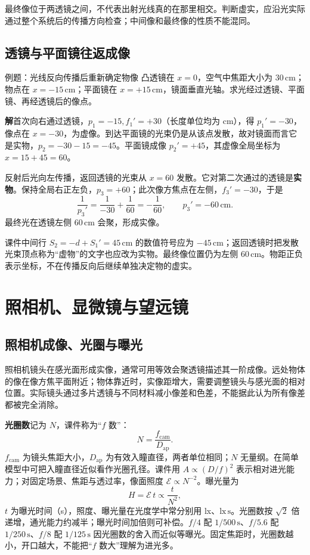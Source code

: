 \documentclass[UTF8,fontset=none,zihao=-4,a4paper]{ctexart}
\newcommand{\chapterpage}[1]{\clearpage\section{#1}}
\newcommand{\term}[1]{\textbf{#1}}
\newcommand{\unit}[1]{\,\mathrm{#1}}
\newcommand{\sol}{\par\noindent\textbf{解}\quad}
\begin{document}
最终像位于两透镜之间，不代表出射光线真的在那里相交。判断虚实，应沿光实际通过整个系统后的传播方向检查；中间像和最终像的性质不能混同。

\subsection{透镜与平面镜往返成像}
\begin{infobox}{例题：光线反向传播后重新确定物像}
凸透镜在 $x=0$，空气中焦距大小为 $30\unit{cm}$；物点在 $x=-15\unit{cm}$；平面镜在 $x=+15\unit{cm}$，镜面垂直光轴。求光经过透镜、平面镜、再经透镜后的像点。
\sol 首次向右通过透镜，$p_1=-15,f_1'=+30$（长度单位均为 cm），得 $p_1'=-30$，像点在 $x=-30$，为虚像。到达平面镜的光束仍是从该点发散，故对镜面而言它是实物，$p_2=-30-15=-45$。平面镜成像 $p_2'=+45$，其虚像全局坐标为 $x=15+45=60$。

反射后光向左传播，返回透镜的光束从 $x=60$ 发散。它对第二次通过的透镜是\textbf{实物}。保持全局右正左负，$p_3=+60$；此次像方焦点在左侧，$f_3'=-30$，于是
\[
 \frac1{p_3'}=\frac1{-30}+\frac1{60}=-\frac1{60},
 \qquad p_3'=-60\unit{cm}.
\]
最终光在透镜左侧 $60\unit{cm}$ 会聚，形成实像。
\end{infobox}
课件中间行 $S_2=-d+S_1'=45\unit{cm}$ 的数值符号应为 $-45\unit{cm}$；返回透镜时把发散光束顶点称为“虚物”的文字也应改为实物。最终像位置仍为左侧 $60\unit{cm}$。物距正负表示坐标，不在传播反向后继续单独决定物的虚实。

\chapterpage{照相机、显微镜与望远镜}
\subsection{照相机成像、光圈与曝光}
照相机镜头在感光面形成实像，通常可用等效会聚透镜描述其一阶成像。远处物体的像在像方焦平面附近；物体靠近时，实像距增大，需要调整镜头与感光面的相对位置。实际镜头通过多片透镜与不同材料减小像差和色差，不能据此认为所有像差都被完全消除。

\term{光圈数}记为 $N$，课件称为“$f$ 数”：
\[
 N=\frac{f_{\mathrm{cam}}}{D_{\mathrm{ap}}}.
\]
$f_{\mathrm{cam}}$ 为镜头焦距大小，$D_{\mathrm{ap}}$ 为有效入瞳直径，两者单位相同；$N$ 无量纲。在简单模型中可把入瞳直径近似看作光圈孔径。课件用 $A\propto(D/f)^2$ 表示相对进光能力；对固定场景、焦距与透过率，像面照度 $\mathcal E\propto N^{-2}$。曝光量为
\[
 H=\mathcal E\,t\propto\frac t{N^2},
\]
$t$ 为曝光时间（s），照度、曝光量在光度学中常分别用 lx、$\mathrm{lx\,s}$。光圈数按 $\sqrt2$ 倍递增，通光能力约减半；曝光时间加倍则可补偿。$f/4$ 配 $1/500\unit s$、$f/5.6$ 配 $1/250\unit s$、$f/8$ 配 $1/125\unit s$ 因光圈数的舍入而近似等曝光。固定焦距时，光圈数越小，开口越大，不能把“$f$ 数大”理解为进光多。
\end{document}
